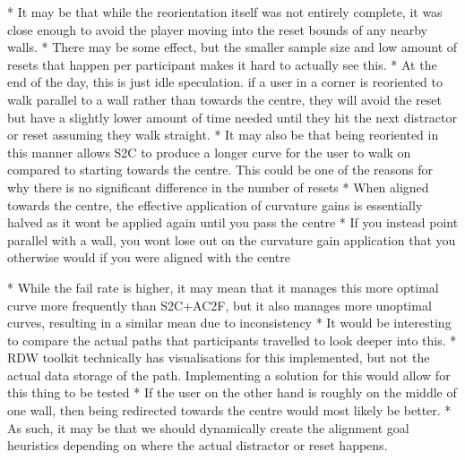    * It may be that while the reorientation itself was not entirely complete, it was close enough to avoid the player moving into the reset bounds of any nearby walls. 
   * There may be some effect, but the smaller sample size and low amount of resets that happen per participant makes it hard to actually see this. 
   * At the end of the day, this is just idle speculation. if a user in a corner is reoriented to walk parallel to a wall rather than towards the centre, they will avoid the reset but have a slightly lower amount of time needed until they hit the next distractor or reset assuming they walk straight.
      * It may also be that being reoriented in this manner allows S2C to produce a longer curve for the user to walk on compared to starting towards the centre. This could be one of the reasons for why there is no significant difference in the number of resets 
      * When aligned towards the centre, the effective application of curvature gains is essentially halved as it wont be applied again until you pass the centre
      * If you instead point parallel with a wall, you wont lose out on the curvature gain application that you otherwise would if you were aligned with the centre
      
      * While the fail rate is higher, it may mean that it manages this more optimal curve more frequently than S2C+AC2F, but it also manages more unoptimal curves, resulting in a similar mean due to inconsistency
      * It would be interesting to compare the actual paths that participants travelled to look deeper into this.
         * RDW toolkit technically has visualisations for this implemented, but not the actual data storage of the path. Implementing a solution for this would allow for this thing to be tested
      * If the user on the other hand is roughly on the middle of one wall, then being redirected towards the centre would most likely be better.
      * As such, it may be that we should dynamically create the alignment goal heuristics depending on where the actual distractor or reset happens. 